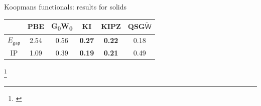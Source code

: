 \documentclass[xcolor=table,aspectratio=169]{beamer}
\newcommand\blfootcite[1]{%
  \begingroup
  \renewcommand\thefootnote{}\footnote{\hspace{-4ex}\cite{#1}}%
  \addtocounter{footnote}{-1}%
  \endgroup
}
\numberwithin{equation}{section}
\begin{document}
\begin{frame}{Koopmans functionals: results for solids}
\begin{minipage}[c]{0.6\textwidth}
      \vspace{1ex}
      \begin{tabular}{c S[table-format = 2.2] S[table-format = 2.2] >{\color{seaborn_red}\bfseries}S[table-format = 2.2] >{\color{seaborn_red}\bfseries}S[table-format = 2.2] S[table-format = 2.2]}
                          & {PBE} & {G\textsubscript{0}W\textsubscript{0}} & {KI} & {KIPZ} & {QSG$\tilde{\mathsf{W}}$} \\
         \midrule
         \midrule
         $E_\mathsf{gap}$ & 2.54  & 0.56                                   & 0.27 & 0.22   & 0.18                      \\
         \midrule
         IP               & 1.09  & 0.39                                   & 0.19 & 0.21   & 0.49                      \\
      \end{tabular}
   \end{minipage}

   \blfootcite{Nguyen2018}
\end{frame}
\end{document}
